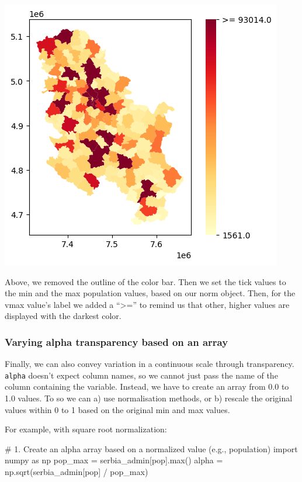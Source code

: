 \documentclass[
  letterpaper,
  DIV=11,
  numbers=noendperiod]{scrreprt}
\newenvironment{Shaded}{\begin{snugshade}}{\end{snugshade}}
\newcommand{\BuiltInTok}[1]{\textcolor[rgb]{0.00,0.23,0.31}{#1}}
\newcommand{\CommentTok}[1]{\textcolor[rgb]{0.37,0.37,0.37}{#1}}
\newcommand{\ImportTok}[1]{\textcolor[rgb]{0.00,0.46,0.62}{#1}}
\newcommand{\NormalTok}[1]{\textcolor[rgb]{0.00,0.23,0.31}{#1}}
\newcommand{\OperatorTok}[1]{\textcolor[rgb]{0.37,0.37,0.37}{#1}}
\newcommand{\StringTok}[1]{\textcolor[rgb]{0.13,0.47,0.30}{#1}}
\begin{document}
\includegraphics{labs/w02_maps_files/figure-pdf/cell-39-output-1.png}

Above, we removed the outline of the color bar. Then we set the tick
values to the min and the max population values, based on our norm
object. Then, for the vmax value's label we added a ``\textgreater='' to
remind us that other, higher values are displayed with the darkest
color.

\subsubsection{Varying alpha transparency based on an
array}\label{varying-alpha-transparency-based-on-an-array}

Finally, we can also convey variation in a continuous scale through
transparency. \texttt{alpha} doesn't expect column names, so we cannot
just pass the name of the column containing the variable. Instead, we
have to create an array from 0.0 to 1.0 values. To so we can a) use
normalisation methods, or b) rescale the original values within 0 to 1
based on the original min and max values.

For example, with square root normalization:

\begin{Shaded}
\begin{Highlighting}[]
\CommentTok{\# 1. Create an alpha array based on a normalized value (e.g., population)}
\ImportTok{import}\NormalTok{ numpy }\ImportTok{as}\NormalTok{ np}
\NormalTok{pop\_max }\OperatorTok{=}\NormalTok{ serbia\_admin[}\StringTok{\textquotesingle{}pop\textquotesingle{}}\NormalTok{].}\BuiltInTok{max}\NormalTok{()}
\NormalTok{alpha }\OperatorTok{=}\NormalTok{ np.sqrt(serbia\_admin[}\StringTok{\textquotesingle{}pop\textquotesingle{}}\NormalTok{] }\OperatorTok{/}\NormalTok{ pop\_max) }
\end{Highlighting}
\end{Shaded}
\end{document}
